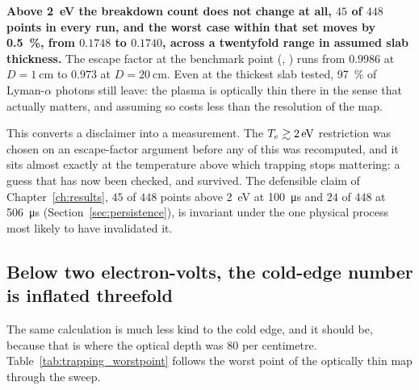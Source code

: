 \textbf{Above \SI{2}{\electronvolt} the breakdown count does not change at all,
$45$ of $448$ points in every run, and the worst case within that set
moves by \SI{0.5}{\percent}, from $0.1748$ to $0.1740$, across a twentyfold
range in assumed slab thickness.} The escape factor at the benchmark point
(\benchTe, \benchne) runs from $0.9986$ at $D = \SI{1}{\centi\metre}$ to
$0.973$ at $D = \SI{20}{\centi\metre}$. Even at the thickest slab tested,
\SI{97}{\percent} of Lyman-$\alpha$ photons still leave: the plasma is optically
thin there in the sense that actually matters, and assuming so costs less than
the resolution of the map.

This converts a disclaimer into a measurement. The
$T_e \gtrsim \SI{2}{\electronvolt}$ restriction was chosen on an escape-factor
argument before any of this was recomputed, and it sits almost exactly at the
temperature above which trapping stops mattering: a guess that has now been
checked, and survived. The defensible claim of Chapter~\ref{ch:results}, $45$
of $448$ points above \SI{2}{\electronvolt} at \SI{100}{\micro\second} and $24$
of $448$ at \SI{506}{\micro\second} (Section~\ref{sec:persistence}), is
invariant under the one physical process most likely to have invalidated it.

\subsection{Below two electron-volts, the cold-edge number is inflated
threefold}

The same calculation is much less kind to the cold edge, and it should be,
because that is where the optical depth was $80$ per centimetre.
Table~\ref{tab:trapping_worstpoint} follows the worst point of the optically
thin map through the sweep.

